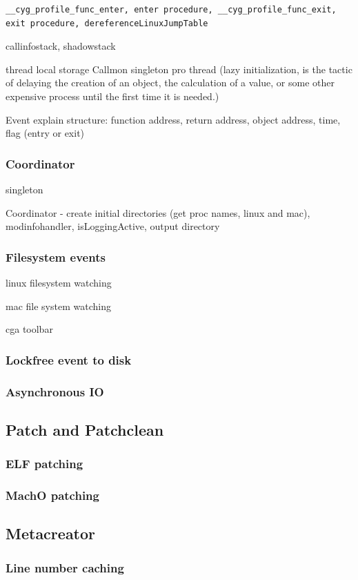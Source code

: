 \begin{verbatim}
__cyg_profile_func_enter, enter procedure, __cyg_profile_func_exit, 
exit procedure, dereferenceLinuxJumpTable
\end{verbatim}

callinfostack, shadowstack

thread local storage
Callmon singleton pro thread (lazy initialization, is the tactic of delaying the creation of an object, the calculation of a value, or some other expensive process until the first time it is needed.)

Event explain structure:
function address, return address, object address, time, flag (entry or exit)

\subsubsection{Coordinator}

singleton

Coordinator - create initial directories (get proc names, linux and mac), modinfohandler, isLoggingActive, output directory

\subsubsection{Filesystem events}

linux filesystem watching

mac file system watching

cga toolbar

\subsubsection{Lockfree event to disk} 

\subsubsection{Asynchronous IO}

\subsection{Patch and Patchclean} 

\subsubsection{ELF patching} 

\subsubsection{MachO patching}

\subsection{Metacreator} 

\subsubsection{Line number caching} 
